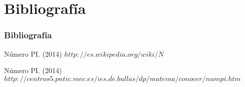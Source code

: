 \documentclass{beamer}
\begin{document}

\section{Bibliografía}
\begin{frame}
  \frametitle{Bibliografía}

  \begin{thebibliography}{10}

    \beamertemplatebookbibitems
    Número PI.
    (2014)
    {\small $http://es.wikipedia.org/wiki/N$}

    \beamertemplatebookbibitems
    Número PI.
    (2014)
    {\small $http://centros5.pntic.mec.es/ies.de.bullas/dp/matema/conocer/numpi.htm$}

  \end{thebibliography}
\end{frame}

\end{document}
